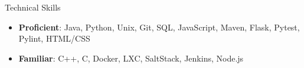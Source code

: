 \documentclass[]{mcdowellcv}
\begin{document}
	
	\begin{cvsection}{Technical Skills}
		\begin{cvsubsection}{}{}{}	
		    \begin{itemize}
				\item \textbf{Proficient}: Java, Python, Unix, Git, SQL, JavaScript, Maven, Flask, Pytest, Pylint, HTML/CSS
				\item \textbf{Familiar}: C++, C, Docker, LXC, SaltStack, Jenkins, Node.js
			\end{itemize}
		\end{cvsubsection}
	\end{cvsection}
\end{document}
